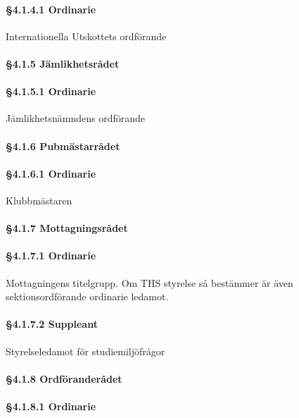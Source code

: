\paragraph{§4.1.4.1 Ordinarie}

Internationella Utskottets ordförande

\paragraph{§4.1.5 Jämlikhetsrådet}

\paragraph{§4.1.5.1 Ordinarie}

Jämlikhetsnämndens ordförande

\paragraph{§4.1.6 Pubmästarrådet}

\paragraph{§4.1.6.1 Ordinarie}

Klubbmästaren

\paragraph{§4.1.7 Mottagningsrådet}

\paragraph{§4.1.7.1 Ordinarie}

Mottagningens titelgrupp. Om THS styrelse så bestämmer är även sektionsordförande ordinarie ledamot.

\paragraph{§4.1.7.2 Suppleant}

Styrelseledamot för studiemiljöfrågor

\paragraph{§4.1.8 Ordföranderådet}

\paragraph{§4.1.8.1 Ordinarie}

